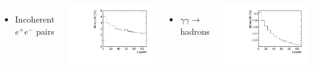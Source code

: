 \documentclass[final,xcolor={dvipsnames,svgnames,x11names,table}]{beamer}
\begin{document}
\begin{frame}
\begin{textblock}{80}
\begin{tcolorbox}[title=3 main sources of beam-induced backgrounds at the top stage]
  \begin{columns}
    \begin{itemize}
      \item Incoherent $e^+e^-$ pairs
    \end{itemize}
    \centering
    \includegraphics[width=\textwidth]{Figures/IPC_top}

    \begin{itemize}
      \item $\gamma\gamma\rightarrow$ hadrons
    \end{itemize}
    \centering
    \includegraphics[width=\textwidth]{Figures/Hadrons_top}


\end{columns}
\end{tcolorbox}
\end{textblock}
\end{frame}
\end{document}
